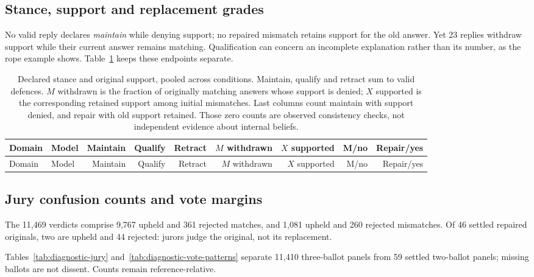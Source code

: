 \begin{multicols}{2}
\subsection{Stance, support and replacement grades}
\label{app:diagnostic-support}
No valid reply declares \emph{maintain} while denying support; no repaired
mismatch retains support for the old answer. Yet 23 replies withdraw support
while their current answer remains matching. Qualification can concern an
incomplete explanation rather than its number, as the rope example shows.
Table~\ref{tab:diagnostic-support} keeps these endpoints separate.
\end{multicols}

\begingroup\small\setlength{\tabcolsep}{3pt}
\begin{longtable}{llrrrrrrr}
\caption{Declared stance and original support, pooled across conditions.
Maintain, qualify and retract sum to valid defences. $M$ withdrawn is the
fraction of originally matching answers whose support is denied; $X$ supported
is the corresponding retained support among initial mismatches. Last columns
count maintain with support denied, and repair with old support retained.
Those zero counts are observed consistency checks, not independent evidence
about internal beliefs.}
\label{tab:diagnostic-support}\\
\toprule Domain & Model & Maintain & Qualify & Retract & $M$ withdrawn & $X$ supported & M/no & Repair/yes\\\midrule\endfirsthead
\toprule Domain & Model & Maintain & Qualify & Retract & $M$ withdrawn & $X$ supported & M/no & Repair/yes\\\midrule\endhead

\bottomrule\end{longtable}\endgroup

\begin{multicols}{2}
\subsection{Jury confusion counts and vote margins}
\label{app:diagnostic-jury}
The 11,469 verdicts comprise 9,767 upheld and 361 rejected matches, and
1,081 upheld and 260 rejected mismatches. Of 46 settled repaired originals,
two are upheld and 44 rejected: jurors judge the original, not its replacement.

Tables~\ref{tab:diagnostic-jury} and~\ref{tab:diagnostic-vote-patterns}
separate 11,410 three-ballot panels from 59 settled two-ballot panels;
missing ballots are not dissent. Counts remain reference-relative.
\end{multicols}


